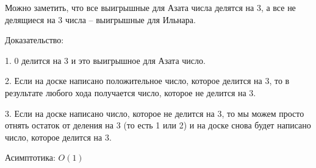 \solutionSection

Можно заметить, что все выигрышные для Азата числа делятся на 3, 
а все не делящиеся на 3 числа – выигрышные для Ильнара.

Доказательство:

1. 0 делится на 3 и это выигрышное для Азата число.

2. Если на доске написано положительное число, которое делится на 3,
то в результате любого хода получается число, которое не делится на 3.

3. Если на доске написано число, которое не делится на 3,
то мы можем просто отнять остаток от деления на 3 (то есть 1 или 2)
и на доске снова будет написано число, которое делится на 3.

Асимптотика: $O(1)$

\codeExample

